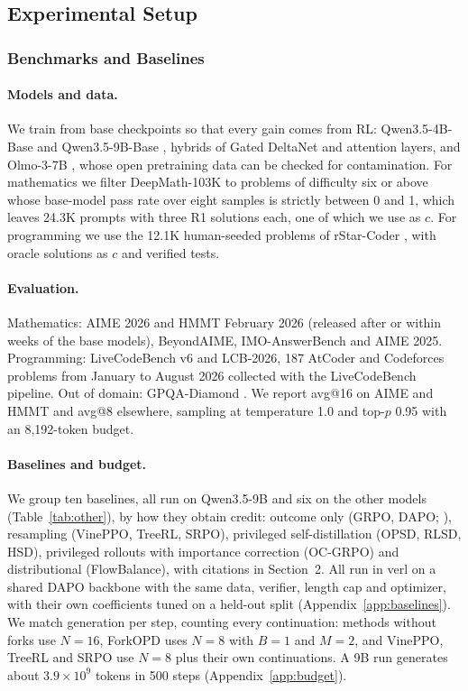 \documentclass[11pt]{article}
\newcommand{\method}{ForkOPD}
\theoremstyle{remark}
\begin{document}
\subsection{Experimental Setup}

\subsubsection{Benchmarks and Baselines}

\paragraph{Models and data.}
We train from base checkpoints so that every gain comes from RL: Qwen3.5-4B-Base and Qwen3.5-9B-Base \citep{qwen35}, hybrids of Gated DeltaNet and attention layers, and Olmo-3-7B \citep{olmo2025olmo3}, whose open pretraining data can be checked for contamination. For mathematics we filter DeepMath-103K \citep{he2026deepmath} to problems of difficulty six or above whose base-model pass rate over eight samples is strictly between 0 and 1, which leaves 24.3K prompts with three R1 solutions each, one of which we use as $c$. For programming we use the 12.1K human-seeded problems of rStar-Coder \citep{liu2025rstarcoder}, with oracle solutions as $c$ and verified tests.

\paragraph{Evaluation.}
Mathematics: AIME 2026 and HMMT February 2026 (released after or within weeks of the base models), BeyondAIME, IMO-AnswerBench \citep{luong2025robust} and AIME 2025. Programming: LiveCodeBench v6 \citep{jain2025livecodebench} and LCB-2026, 187 AtCoder and Codeforces problems from January to August 2026 collected with the LiveCodeBench pipeline. Out of domain: GPQA-Diamond \citep{rein2024gpqa}. We report avg@16 on AIME and HMMT and avg@8 elsewhere, sampling at temperature 1.0 and top-$p$ 0.95 with an 8{,}192-token budget.

\paragraph{Baselines and budget.}
We group ten baselines, all run on Qwen3.5-9B and six on the other models (Table~\ref{tab:other}), by how they obtain credit: outcome only (GRPO, DAPO; \citealp{shao2024deepseekmath,yu2025dapo}), resampling (VinePPO, TreeRL, SRPO), privileged self-distillation (OPSD, RLSD, HSD), privileged rollouts with importance correction (OC-GRPO) and distributional (FlowBalance), with citations in Section~2. All run in verl \citep{sheng2025hybridflow} on a shared DAPO backbone with the same data, verifier, length cap and optimizer, with their own coefficients tuned on a held-out split (Appendix~\ref{app:baselines}). We match generation per step, counting every continuation: methods without forks use $N=16$, \method{} uses $N=8$ with $B=1$ and $M=2$, and VinePPO, TreeRL and SRPO use $N=8$ plus their own continuations. A 9B run generates about $3.9\times10^9$ tokens in 500 steps (Appendix~\ref{app:budget}).
\end{document}
